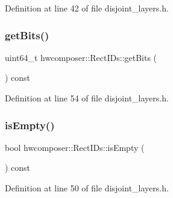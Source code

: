 Definition at line 42 of file disjoint\+\_\+layers.\+h.


\begin{DoxyCode}{0}
\end{DoxyCode}
\mbox{\label{structhwcomposer_1_1RectIDs_a67b104d47b752031f3a9c568ef2fdd4b}} 
\subsubsection{\texorpdfstring{get\+Bits()}{getBits()}}
{\footnotesize\ttfamily uint64\+\_\+t hwcomposer\+::\+Rect\+I\+Ds\+::get\+Bits (\begin{DoxyParamCaption}{ }\end{DoxyParamCaption}) const\hspace{0.3cm}{\ttfamily [inline]}}



Definition at line 54 of file disjoint\+\_\+layers.\+h.


\begin{DoxyCode}{0}
\end{DoxyCode}
\mbox{\label{structhwcomposer_1_1RectIDs_ac28f3d87424ac65cabb08a5fba379581}} 
\subsubsection{\texorpdfstring{is\+Empty()}{isEmpty()}}
{\footnotesize\ttfamily bool hwcomposer\+::\+Rect\+I\+Ds\+::is\+Empty (\begin{DoxyParamCaption}{ }\end{DoxyParamCaption}) const\hspace{0.3cm}{\ttfamily [inline]}}



Definition at line 50 of file disjoint\+\_\+layers.\+h.


